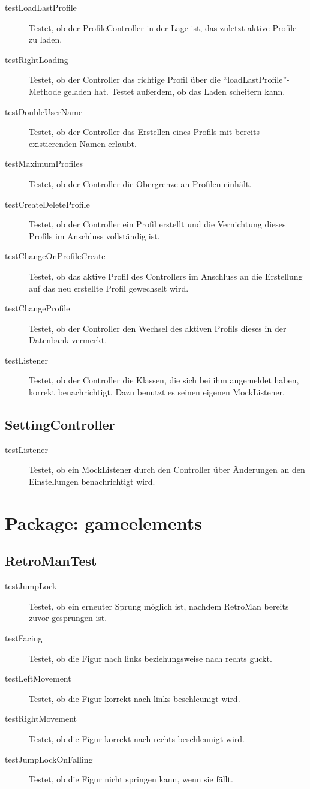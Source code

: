 \documentclass[parskip=full]{scrreprt}
\begin{document}
\begin{description}
	\item[testLoadLastProfile] Testet, ob der ProfileController in der Lage ist, das zuletzt aktive Profile zu laden.
	\item[testRightLoading] Testet, ob der Controller das richtige Profil über die \enquote{loadLastProfile}-Methode geladen hat. Testet außerdem, ob das Laden scheitern kann.
	\item[testDoubleUserName] Testet, ob der Controller das Erstellen eines Profils mit bereits existierenden Namen erlaubt.
	\item[testMaximumProfiles] Testet, ob der Controller die Obergrenze an Profilen einhält.
	\item[testCreateDeleteProfile] Testet, ob der Controller ein Profil erstellt und die Vernichtung dieses Profils im Anschluss vollständig ist.
	\item[testChangeOnProfileCreate] Testet, ob das aktive Profil des Controllers im Anschluss an die Erstellung auf das neu erstellte Profil gewechselt wird.
	\item[testChangeProfile] Testet, ob der Controller den Wechsel des aktiven Profils dieses in der Datenbank vermerkt.
	\item[testListener] Testet, ob der Controller die Klassen, die sich bei ihm angemeldet haben, korrekt benachrichtigt. Dazu benutzt es seinen eigenen MockListener.
\end{description}

\subsection{SettingController}

\begin{description}
	\item [testListener] Testet, ob ein MockListener durch den Controller über Änderungen an den Einstellungen benachrichtigt wird.
\end{description}

\section{Package: gameelements}

\subsection{RetroManTest}

\begin{description}
	\item[testJumpLock] Testet, ob ein erneuter Sprung möglich ist, nachdem RetroMan bereits zuvor gesprungen ist.
	\item[testFacing] Testet, ob die Figur nach links beziehungsweise nach rechts guckt.
	\item[testLeftMovement] Testet, ob die Figur korrekt nach links beschleunigt wird.
	\item[testRightMovement] Testet, ob die Figur korrekt nach rechts beschleunigt wird.
	\item[testJumpLockOnFalling] Testet, ob die Figur nicht springen kann, wenn sie fällt.
\end{description}
\end{document}
